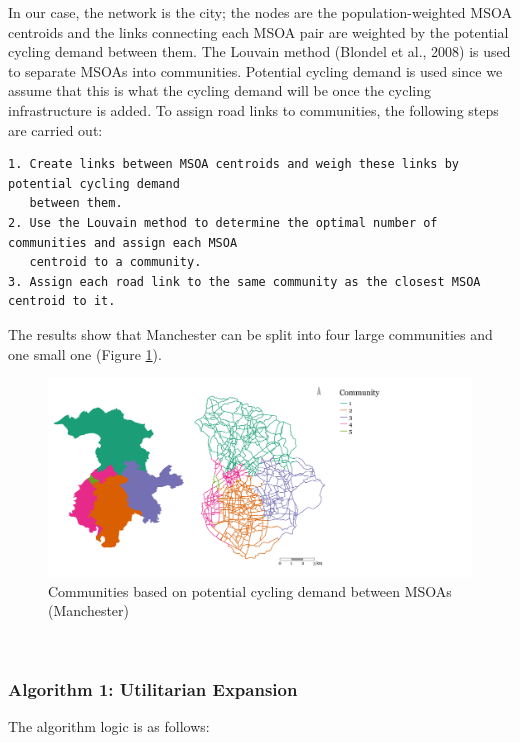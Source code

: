 \documentclass[
]{article}
\begin{document}
In our case, the network is the city; the nodes are the population-weighted MSOA centroids and the links connecting each MSOA pair are weighted by the potential cycling demand between them.
The Louvain method (Blondel et al., 2008) is used to separate MSOAs into communities.
Potential cycling demand is used since we assume that this is what the cycling demand will be once the cycling infrastructure is added.
To assign road links to communities, the following steps are carried out:

\begin{verbatim}
1. Create links between MSOA centroids and weigh these links by potential cycling demand 
   between them.
2. Use the Louvain method to determine the optimal number of communities and assign each MSOA 
   centroid to a community.
3. Assign each road link to the same community as the closest MSOA centroid to it.
\end{verbatim}

The results show that Manchester can be split into four large communities and one small one (Figure \ref{fig:communitiesmanchester}).

\begin{figure}

{\centering \includegraphics[width=0.8\linewidth]{data/Manchester/Plots/communities_alternative_Manchester} 

}

\caption{Communities based on potential cycling demand between MSOAs (Manchester)}\label{fig:communitiesmanchester}
\end{figure}

~

\hypertarget{algorithm-1-utilitarian-expansion}{%
\subsubsection{Algorithm 1: Utilitarian Expansion}\label{algorithm-1-utilitarian-expansion}}

The algorithm logic is as follows:
\end{document}
